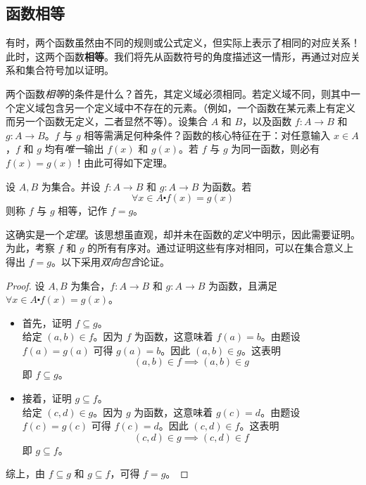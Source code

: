 
\subsection{函数相等}

有时，两个函数虽然由不同的规则或公式定义，但实际上表示了相同的对应关系！此时，这两个函数\textbf{相等}。我们将先从函数符号的角度描述这一情形，再通过对应关系和集合符号加以证明。

两个函数\emph{相等}的条件是什么？首先，其定义域必须相同。若定义域不同，则其中一个定义域包含另一个定义域中不存在的元素。（例如，一个函数在某元素上有定义而另一个函数无定义，二者显然不等）。设集合 $A$ 和 $B$，以及函数 $f : A \to B$ 和 $g : A \to B$。$f$ 与 $g$ 相等需满足何种条件？函数的核心特征在于：对任意输入 $x \in A$，$f$ 和 $g$ 均有\emph{唯一}输出 $f(x)$ 和 $g(x)$。若 $f$ 与 $g$ 为同一函数，则必有 $f(x) = g(x)$！由此可得如下定理。

\begin{theorem}
   设 $A, B$ 为集合。并设 $f : A \to B$ 和 $g : A \to B$ 为函数。若
   \[\forall x \in A \centerdot f(x) = g(x)\]
   则称 $f$ 与 $g$ 相等，记作 $f = g$。
\end{theorem}

这确实是一个\emph{定理}。该思想虽直观，却并未在函数的\emph{定义}中明示，因此需要证明。为此，考察 $f$ 和 $g$ 的所有有序对。通过证明这些有序对相同，可以在集合意义上得出 $f = g$。以下采用\emph{双向包含}论证。

\begin{proof}
   设 $A, B$ 为集合，$f : A \to B$ 和 $g : A \to B$ 为函数，且满足 $\forall x \in A \centerdot f(x) = g(x)$。
   \begin{itemize}
      \item 首先，证明 $f \subseteq g$。\\
            给定 $(a,b) \in f$。因为 $f$ 为函数，这意味着 $f(a) = b$。由题设 $f(a) = g(a)$ 可得 $g(a) = b$。因此 $(a,b) \in g$。这表明
            \[(a, b) \in f \implies (a, b) \in g\]
            即 $f \subseteq g$。
      \item 接着，证明 $g \subseteq f$。\\
            给定 $(c,d) \in g$。因为 $g$ 为函数，这意味着 $g(c) = d$。由题设 $f(c) = g(c)$ 可得 $f(c) = d$。因此 $(c,d) \in f$。这表明
            \[(c, d) \in g \implies (c, d) \in f\]
            即 $g \subseteq f$。
   \end{itemize}
    
   综上，由 $f \subseteq g$ 和 $g \subseteq f$，可得 $f = g$。
\end{proof}

